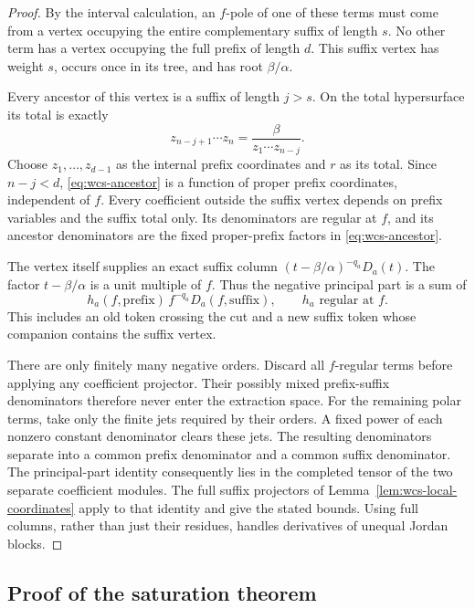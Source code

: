 \documentclass[11pt]{article}
\theoremstyle{definition}\newtheorem{definition}[theorem]{Definition}
\begin{document}
\begin{proof}
By the interval calculation, an \(f\)-pole of one of these
terms must come from a vertex occupying the entire complementary
suffix of length \(s\).  No other term has a vertex occupying
the full prefix of length \(d\).  This suffix vertex has
weight \(s\), occurs once in its tree, and has root
\(\beta/\alpha\).

Every ancestor of this vertex is a suffix of length \(j>s\).
On the total hypersurface its total is exactly
\begin{equation}\label{eq:wcs-ancestor}
 z_{n-j+1}\cdots z_n
       =\frac{\beta}{z_1\cdots z_{n-j}}.
\end{equation}
Choose \(z_1,\ldots,z_{d-1}\) as the internal prefix
coordinates and \(r\) as its total.  Since \(n-j<d\),
\eqref{eq:wcs-ancestor} is a function of proper prefix
coordinates, independent of \(f\).  Every coefficient
outside the suffix vertex depends on prefix variables
and the suffix total only.  Its denominators are regular
at \(f\), and its ancestor denominators are the fixed
proper-prefix factors in \eqref{eq:wcs-ancestor}.

The vertex itself supplies an exact suffix column
\((t-\beta/\alpha)^{-q_a}D_a(t)\).  The factor
\(t-\beta/\alpha\) is a unit multiple of \(f\).
Thus the negative principal part is a sum of
\[
 h_a(f,\text{prefix})\,f^{-q_a}D_a(f,\text{suffix}),
 \qquad h_a\text{ regular at }f.
\]
This includes an old token crossing the cut and a new suffix
token whose companion contains the suffix vertex.

There are only finitely many negative orders.  Discard all
\(f\)-regular terms before applying any coefficient
projector.  Their possibly mixed prefix-suffix denominators
therefore never enter the extraction space.  For the remaining
polar terms, take only the finite jets required by their
orders.  A fixed power of each nonzero constant denominator
clears these jets.  The resulting denominators separate into
a common prefix denominator and a common suffix denominator.
The principal-part identity consequently lies in the
completed tensor of the two separate coefficient modules.
The full suffix projectors of
Lemma~\ref{lem:wcs-local-coordinates} apply to that identity
and give the stated bounds.  Using full columns, rather
than just their residues, handles derivatives of unequal
Jordan blocks.
\end{proof}

\subsection{Proof of the saturation theorem}
\end{document}
